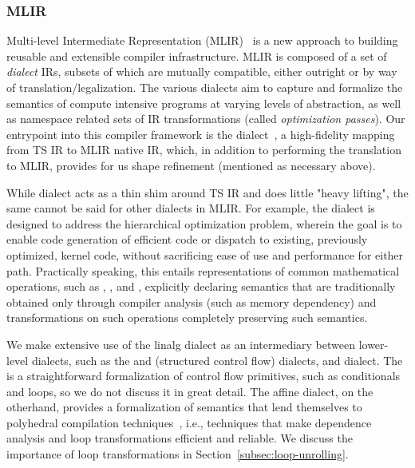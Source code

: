 \subsubsection{MLIR}\label{subsec:mlir}

Multi-level Intermediate Representation (MLIR)~\cite{https://doi.org/10.48550/arxiv.2002.11054} is a new approach to building reusable and extensible compiler infrastructure.
MLIR is composed of a set of \emph{dialect} IRs, subsets of which are mutually compatible, either outright or by way of translation/legalization.
The various dialects aim to capture and formalize the semantics of compute intensive programs at varying levels of abstraction, as well as namespace related sets of IR transformations (called \emph{optimization passes}).
Our entrypoint into this compiler framework is the  dialect~\cite{torch-mlir}, a high-fidelity mapping from TS IR to MLIR native IR, which, in addition to performing the translation to MLIR, provides for us shape refinement (mentioned as necessary above).

While  dialect acts as a thin shim around TS IR and does little "heavy lifting", the same cannot be said for other dialects in MLIR.
For example, the  dialect is designed to address the hierarchical optimization problem, wherein the goal is to enable code generation of efficient code or dispatch to existing, previously optimized, kernel code, without sacrificing ease of use and performance for either path.
Practically speaking, this entails representations of common mathematical operations, such as , , and , explicitly declaring semantics that are traditionally obtained only through compiler analysis (such as memory dependency) and transformations on such operations completely preserving such semantics.

We make extensive use of the linalg dialect as an intermediary between lower-level dialects, such as the  and  (structured control flow) dialects, and  dialect.
The  is a straightforward formalization of control flow primitives, such as conditionals and loops, so we do not discuss it in great detail.
The affine dialect, on the otherhand, provides a formalization of semantics that lend themselves to polyhedral compilation techniques~\cite{polyhedral-mlir}, i.e., techniques that make dependence analysis and loop transformations efficient and reliable.
We discuss the importance of loop transformations in Section~\ref{subsec:loop-unrolling}.

